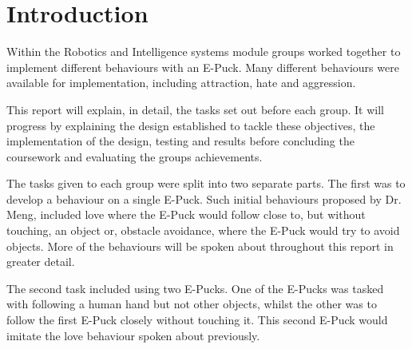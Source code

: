 \section{Introduction} \label{sec:intro}
Within the Robotics and Intelligence systems module groups worked together to implement different behaviours with an E-Puck. Many different behaviours were available for implementation, including attraction, hate and aggression.

This report will explain, in detail, the tasks set out before each group. It will progress by explaining the design established to tackle these objectives, the implementation of the design, testing and results before concluding the coursework and evaluating the groups achievements.

The tasks given to each group were split into two separate parts. The first was to develop a behaviour on a single E-Puck. Such initial behaviours proposed by Dr. Meng, included love where the E-Puck would follow close to, but without touching, an object or, obstacle avoidance, where the E-Puck would try to avoid objects. More of the behaviours will be spoken about throughout this report in greater detail.

The second task included using two E-Pucks. One of the E-Pucks was tasked with following a human hand but not other objects, whilst the other was to follow the first E-Puck closely without touching it. This second E-Puck would imitate the love behaviour spoken about previously.